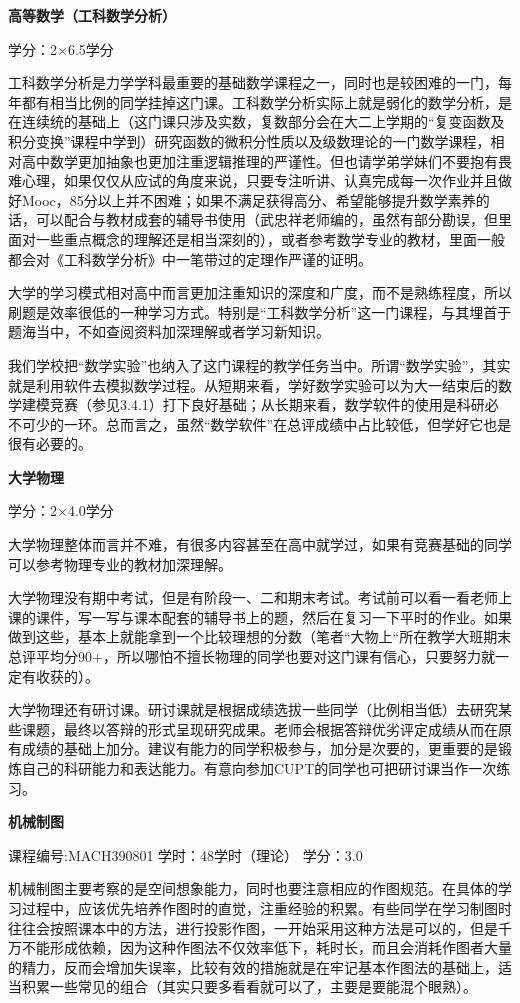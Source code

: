 \documentclass[
decoration,  %
]{qyxf-book}
\begin{document}
\textbf{高等数学（工科数学分析）}

学分：2$\times$6.5学分

工科数学分析是力学学科最重要的基础数学课程之一，同时也是较困难的一门，每年都有相当比例的同学挂掉这门课。工科数学分析实际上就是弱化的数学分析，是在连续统的基础上（这门课只涉及实数，复数部分会在大二上学期的“复变函数及积分变换”课程中学到）研究函数的微积分性质以及级数理论的一门数学课程，相对高中数学更加抽象也更加注重逻辑推理的严谨性。但也请学弟学妹们不要抱有畏难心理，如果仅仅从应试的角度来说，只要专注听讲、认真完成每一次作业并且做好Mooc，85分以上并不困难；如果不满足获得高分、希望能够提升数学素养的话，可以配合与教材成套的辅导书使用（武忠祥老师编的，虽然有部分勘误，但里面对一些重点概念的理解还是相当深刻的），或者参考数学专业的教材，里面一般都会对《工科数学分析》中一笔带过的定理作严谨的证明。

大学的学习模式相对高中而言更加注重知识的深度和广度，而不是熟练程度，所以刷题是效率很低的一种学习方式。特别是“工科数学分析”这一门课程，与其埋首于题海当中，不如查阅资料加深理解或者学习新知识。

我们学校把“数学实验”也纳入了这门课程的教学任务当中。所谓“数学实验”，其实就是利用软件去模拟数学过程。从短期来看，学好数学实验可以为大一结束后的数学建模竞赛（参见3.4.1）打下良好基础；从长期来看，数学软件的使用是科研必不可少的一环。总而言之，虽然“数学软件”在总评成绩中占比较低，但学好它也是很有必要的。

\textbf{大学物理}

学分：2$\times$4.0学分

大学物理整体而言并不难，有很多内容甚至在高中就学过，如果有竞赛基础的同学可以参考物理专业的教材加深理解。
	
大学物理没有期中考试，但是有阶段一、二和期末考试。考试前可以看一看老师上课的课件，写一写与课本配套的辅导书上的题，然后在复习一下平时的作业。如果做到这些，基本上就能拿到一个比较理想的分数（笔者“大物上“所在教学大班期末总评平均分90+，所以哪怕不擅长物理的同学也要对这门课有信心，只要努力就一定有收获的）。
	
大学物理还有研讨课。研讨课就是根据成绩选拔一些同学（比例相当低）去研究某些课题，最终以答辩的形式呈现研究成果。老师会根据答辩优劣评定成绩从而在原有成绩的基础上加分。建议有能力的同学积极参与，加分是次要的，更重要的是锻炼自己的科研能力和表达能力。有意向参加CUPT的同学也可把研讨课当作一次练习。


\textbf{机械制图}


课程编号:MACH390801 学时：48学时（理论） 学分：3.0


机械制图主要考察的是空间想象能力，同时也要注意相应的作图规范。在具体的学习过程中，应该优先培养作图时的直觉，注重经验的积累。有些同学在学习制图时往往会按照课本中的方法，进行投影作图，一开始采用这种方法是可以的，但是千万不能形成依赖，因为这种作图法不仅效率低下，耗时长，而且会消耗作图者大量的精力，反而会增加失误率，比较有效的措施就是在牢记基本作图法的基础上，适当积累一些常见的组合（其实只要多看看就可以了，主要是要能混个眼熟）。
\end{document}
